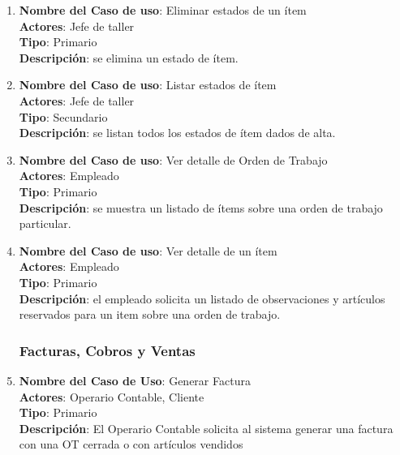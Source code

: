 \documentclass[12pt]{extarticle}
\begin{document}
\begin{spacing}{1.2}
\begin{enumerate}
        \item 	\textbf{Nombre del Caso de uso}: Eliminar estados de un ítem\\
                \textbf{Actores}: Jefe de taller\\
                \textbf{Tipo}: Primario\\
                \textbf{Descripción}: se elimina un estado de ítem.
        
        \item 	\textbf{Nombre del Caso de uso}: Listar estados de ítem\\
                \textbf{Actores}: Jefe de taller\\
                \textbf{Tipo}: Secundario\\
                \textbf{Descripción}: se listan todos los estados de ítem dados de alta.

        \item 	\textbf{Nombre del Caso de uso}: Ver detalle de Orden de Trabajo\\
                \textbf{Actores}: Empleado\\
                \textbf{Tipo}: Primario\\
                \textbf{Descripción}: se muestra un listado de ítems sobre una orden de trabajo particular.

        \item 	\textbf{Nombre del Caso de uso}: Ver detalle de un ítem\\
                \textbf{Actores}: Empleado\\
                \textbf{Tipo}: Primario\\
                \textbf{Descripción}: el empleado solicita un listado de observaciones y artículos reservados para un item sobre una orden de trabajo.



        \subsubsection{Facturas, Cobros y Ventas}



        \item 	\textbf{Nombre del Caso de Uso}: Generar Factura\\
                \textbf{Actores}: Operario Contable, Cliente\\
                \textbf{Tipo}: Primario\\
                \textbf{Descripción}: El Operario Contable solicita al sistema generar una factura con una OT cerrada o con artículos vendidos


\end{enumerate}
\end{spacing}
\end{document}
